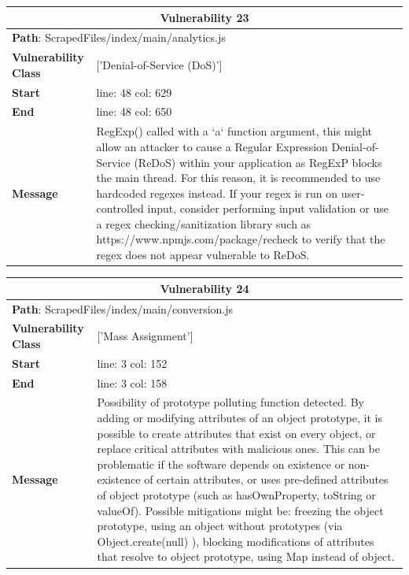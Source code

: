 \documentclass[12pt]{article}
\begin{document}
\vspace{0.7cm}
\FloatBarrier
\begin{table}[!h]
\centering
\renewcommand{\arraystretch}{1.3}
\begin{tabular}{|l|p{10cm}|}
\hline
\multicolumn{2}{|c|}{\textbf{Vulnerability 23}} \\
\hline
\multicolumn{2}{|l|}{\textbf{Path}: ScrapedFiles/index/main/analytics.js} \\
\hline
\textbf{Vulnerability Class} & ['Denial-of-Service (DoS)'] \\
\hline
\textbf{Start} & line: 48 \quad col: 629 \\
\hline
\textbf{End} & line: 48 \quad col: 650 \\
\hline
\textbf{Message} & RegExp() called with a `a` function argument, this might allow an attacker to cause a Regular Expression Denial-of-Service (ReDoS) within your application as RegExP blocks the main thread. For this reason, it is recommended to use hardcoded regexes instead. If your regex is run on user-controlled input, consider performing input validation or use a regex checking/sanitization library such as https://www.npmjs.com/package/recheck to verify that the regex does not appear vulnerable to ReDoS. \\
\hline
\end{tabular}
\end{table}
\vspace{0.7cm}
\FloatBarrier
\begin{table}[!h]
\centering
\renewcommand{\arraystretch}{1.3}
\begin{tabular}{|l|p{10cm}|}
\hline
\multicolumn{2}{|c|}{\textbf{Vulnerability 24}} \\
\hline
\multicolumn{2}{|l|}{\textbf{Path}: ScrapedFiles/index/main/conversion.js} \\
\hline
\textbf{Vulnerability Class} & ['Mass Assignment'] \\
\hline
\textbf{Start} & line: 3 \quad col: 152 \\
\hline
\textbf{End} & line: 3 \quad col: 158 \\
\hline
\textbf{Message} & Possibility of prototype polluting function detected. By adding or modifying attributes of an object prototype, it is possible to create attributes that exist on every object, or replace critical attributes with malicious ones. This can be problematic if the software depends on existence or non-existence of certain attributes, or uses pre-defined attributes of object prototype (such as hasOwnProperty, toString or valueOf). Possible mitigations might be: freezing the object prototype, using an object without prototypes (via Object.create(null) ), blocking modifications of attributes that resolve to object prototype, using Map instead of object. \\
\hline
\end{tabular}
\end{table}
\end{document}
